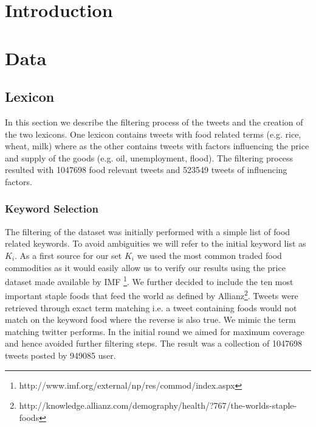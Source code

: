 \documentclass[12pt]{report}
\begin{document}
\setcounter{page}{1}
\chapter{Introduction}















\chapter{Data}



\section{Lexicon}

In this section we describe the filtering process of the tweets and the creation of the two lexicons.  One lexicon contains tweets with food related terms (e.g. rice, wheat, milk) where as the other contains tweets with factors influencing the price and supply of the goods (e.g. oil, unemployment, flood). The filtering process resulted with 1047698 food relevant tweets and 523549  tweets of influencing factors. 

\subsection{Keyword Selection}

The filtering of the dataset was initially performed with a simple list of food related keywords. To avoid ambiguities we will refer to the initial keyword list as $K_i$. As a first source for our set $K_i$ we used the most common traded food commodities as it would easily allow us to verify our results using the price dataset made available by IMF \footnote{http://www.imf.org/external/np/res/commod/index.aspx}. We further decided to include the ten most important staple foods that feed the world as defined by Allianz\footnote{http://knowledge.allianz.com/demography/health/?767/the-worlds-staple-foods}. Tweets were retrieved through exact term matching i.e. a tweet containing foods would not match on the keyword food where the reverse is also true. We mimic the term matching twitter performs. In the initial round we aimed for maximum coverage and hence avoided further filtering steps. The result was a collection of 1047698 tweets posted by 949085 user. 
\end{document}
